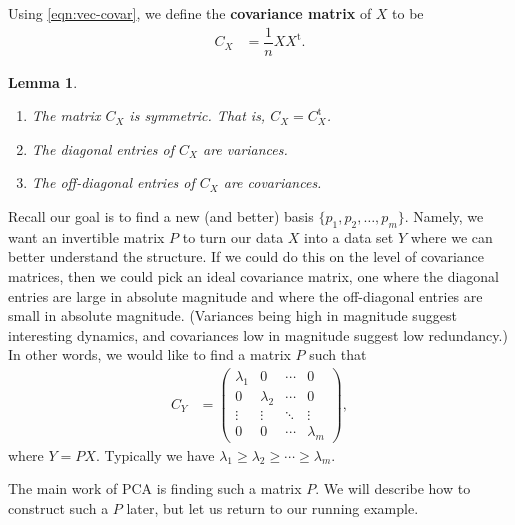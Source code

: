 \documentclass[a4paper, 12pt]{article}
\numberwithin{equation}{section}
\numberwithin{figure}{section}
\newtheorem{lem}[thm]{Lemma}
\theoremstyle{definition}
\renewcommand{\geq}{\geqslant}
\newcommand{\tr}{\mathrm{t}}
\begin{document}
Using \eqref{eqn:vec-covar}, we define the
\textbf{covariance matrix} of $X$ to be 
\begin{align*} 
	C_X &= \dfrac{1}{n} XX^{\tr} .
\end{align*} 

\begin{lem}\label{lem:covariance-properties}
	\hfill 
	\begin{enumerate}
		\item The matrix $C_X$ is symmetric. That is, $C_X = C_X^{\tr}$.
		\item The diagonal entries of $C_X$ are variances.
		\item The off-diagonal entries of $C_X$ are covariances.
	\end{enumerate}
\end{lem}

Recall our goal is to find a new (and better) basis $\{p_1, p_2, \dots, p_m\}$.
Namely, we want an invertible matrix $P$ to turn our data $X$ into a data set
$Y$ where we can better understand the structure. If we could do this on the
level of covariance matrices, then we could pick an ideal covariance matrix, one
where the diagonal entries are large in absolute magnitude and where the
off-diagonal entries are small in absolute magnitude. (Variances being high in
magnitude suggest interesting dynamics, and covariances low in magnitude suggest
low redundancy.) In other words, we would like to find a matrix $P$ such that 
\begin{align}\label{eqn:cov-Y}
	C_Y &= \begin{pmatrix}
		\lambda_1 & 0 & \cdots & 0 \\
		0 & \lambda_2 & \cdots & 0 \\
		\vdots & \vdots & \ddots & \vdots \\
		0 & 0 & \cdots & \lambda_m
	\end{pmatrix},
\end{align}
where $Y = PX$. Typically we have $\lambda_1 \geq \lambda_2 \geq \cdots \geq \lambda_m$.

The main work of PCA is finding such a matrix $P$. We will describe how to
construct such a $P$ later, but let us return to our running example.  
\end{document}
